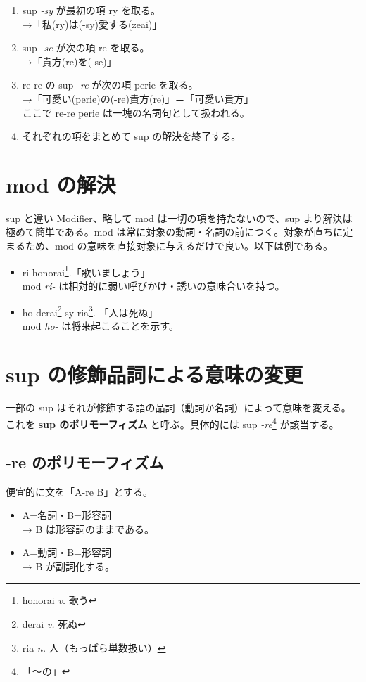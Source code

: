\begin{enumerate}
    \item sup \emph{-sy} が最初の項 ry を取る。\\ →「私(ry)は(-sy)愛する(zeai)」
    \item sup \emph{-se} が次の項 re を取る。 \\ →「貴方(re)を(-se)」
    \item re-re の sup \emph{-re} が次の項 perie を取る。 \\ →「可愛い(perie)の(-re)貴方(re)」＝「可愛い貴方」\\ ここで re-re perie は一塊の名詞句として扱われる。
    \item それぞれの項をまとめて sup の解決を終了する。
\end{enumerate}

\section{mod の解決}

sup と違い Modifier、略して mod は一切の項を持たないので、sup より解決は極めて簡単である。mod は常に対象の動詞・名詞の前につく。対象が直ちに定まるため、mod の意味を直接対象に与えるだけで良い。以下は例である。

\begin{itemize}
    \item ri-honorai\footnote{honorai \emph{v.} 歌う}.「歌いましょう」\\ mod \emph{ri-} は相対的に弱い呼びかけ・誘いの意味合いを持つ。
    \item ho-derai\footnote{derai \emph{v.} 死ぬ}-sy ria\footnote{ria \emph{n.} 人（もっぱら単数扱い）}. 「人は死ぬ」\\ mod \emph{ho-} は将来起こることを示す。
\end{itemize}

\section{sup の修飾品詞による意味の変更}

一部の sup はそれが修飾する語の品詞（動詞か名詞）によって意味を変える。これを \textbf{sup のポリモーフィズム} と呼ぶ。具体的には sup \emph{-re}\footnote{「～の」} が該当する。

\subsection{-re のポリモーフィズム}

便宜的に文を「A-re B」とする。

\begin{itemize}
    \item A=名詞・B=形容詞 \\ → B は形容詞のままである。
    \item A=動詞・B=形容詞 \\ → B が副詞化する。
\end{itemize}